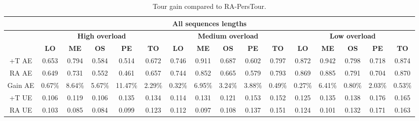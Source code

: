 \begin{table*}[hbt]
\centering

\footnotesize
\caption{Tour gain compared to RA-PersTour.}
\label{tab:gain}
\begin{tabular}{c|ccccc|ccccc|ccccc}
\hline
\multicolumn{16}{c}{\textbf{All sequences lengths}} \\\hline
\multicolumn{1}{c}{} & \multicolumn{5}{c|}{\textbf{High overload}} & \multicolumn{5}{c|}{\textbf{Medium overload}} & \multicolumn{5}{c}{\textbf{Low overload}} \\\hline
 & \textbf{LO} & \textbf{ME} & \textbf{OS} & \textbf{PE} & \textbf{TO} & 
\textbf{LO} & \textbf{ME} & \textbf{OS} & \textbf{PE} & \textbf{TO} & 
\textbf{LO} & \textbf{ME} & \textbf{OS} & \textbf{PE} & \textbf{TO} \\\hline
+T AE & 0.653 & 0.794 & 0.584 & 0.514 & 0.672 & 0.746 & 0.911 & 0.687 & 0.602 & 0.797 & 0.872 & 0.942 & 0.798 & 0.718 & 0.874 \\\hline
RA AE & 0.649 & 0.731 & 0.552 & 0.461 & 0.657 & 0.744 & 0.852 & 0.665 & 0.579 & 0.793 & 0.869 & 0.885 & 0.791 & 0.704 & 0.870 \\\hline
Gain AE &0.67\%&\hspace{-0.2cm}8.64\%&\hspace{-0.2cm}5.67\%&\hspace{-0.2cm}11.47\% &\hspace{-0.2cm} 2.29\% &\hspace{-0.2cm} 0.32\% &\hspace{-0.2cm} 6.95\% &\hspace{-0.2cm} 3.24\% &\hspace{-0.2cm} 3.88\% &\hspace{-0.2cm} 0.49\% &\hspace{-0.2cm} 0.27\% &\hspace{-0.2cm} 6.41\% &\hspace{-0.2cm} 0.80\% &\hspace{-0.2cm} 2.03\% &\hspace{-0.2cm} 0.53\% \\\hline
+T UE & 0.106 & 0.119 & 0.106 & 0.135 & 0.134 & 0.114 & 0.131 & 0.121 & 0.153 & 0.152 & 0.125 & 0.135 & 0.138 & 0.176 & 0.165 \\\hline
RA UE & 0.103 & 0.085 & 0.084 & 0.099 & 0.123 & 0.112 & 0.097 & 0.108 & 0.137 & 0.151 & 0.124 & 0.101 & 0.132 & 0.171 & 0.163 \\\hline

\end{tabular}
\end{table*}

